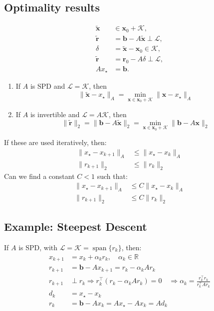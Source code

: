\subsection*{Optimality results}
\begin{align*}
    \widetilde{\mathbf{x}} &  \in  \mathbf{x}_0 + \mathcal{K},                  \\
    \widetilde{\mathbf{r}} & = \mathbf{b} - A\widetilde{\mathbf{x}} \perp \mathcal{L}, \\
    \delta        & = \widetilde{\mathbf{x}} - \mathbf{x}_0  \in  \mathcal{K},  \\
    \widetilde{\mathbf{r}} & = \mathbf{r}_0 - A\delta \perp \mathcal{L},      \\
    A x_\star     & = \mathbf{b}.
\end{align*}
\begin{enumerate}[label=(\alph*)]
    \item If $A$ is SPD and $\mathcal{L} = \mathcal{K}$, then
          \[
              \|\widetilde{\mathbf{x}} - x_\star\|_A = \min_{\mathbf{x}  \in  \mathbf{x}_0 + \mathcal{K}} \|\mathbf{x} - x_\star\|_A
          \]
    \item If $A$ is invertible and $\mathcal{L} = A\mathcal{K}$, then
          \[
              \|\widetilde{\mathbf{r}}\|_2 = \|\mathbf{b} - A\widetilde{\mathbf{x}}\|_2  = \min_{\mathbf{x}  \in  \mathbf{x}_0 + \mathcal{K}} \|\mathbf{b} - A \mathbf{x}\|_2
          \]
\end{enumerate}
If these are used iteratively, then:
\begin{align*}
    \|x_\star - x_{k+1}\|_A & \leq \|x_\star - x_k\|_A \\
    \|r_{k+1}\|_2           & \leq \|r_k\|_2
\end{align*}
Can we find a constant $C < 1$ such that:
\begin{align*}
    \|x_\star - x_{k+1}\|_A & \leq C \|x_\star - x_k\|_A \\
    \|r_{k+1}\|_2           & \leq C \|r_k\|_2
\end{align*}

\subsection*{Example: Steepest Descent}
If $A$ is SPD, with $\mathcal{L} = \mathcal{K} = \operatorname{span}\{r_k\}$, then:
\begin{align*}
    x_{k+1} & = x_k + \alpha_k r_k, \quad \alpha_k  \in  \mathbb{R}          \\
    r_{k+1} & = \mathbf{b} - A x_{k+1} = r_k - \alpha_k A r_k                       \\
    r_{k+1} & \perp r_k \Rightarrow r_k^{\top} (r_k - \alpha_k A r_k) = 0 \quad
    \Rightarrow \alpha_k = \frac{r_k^{\top} r_k}{r_k^{\top} A r_k}                   \\
    d_k     & = x_\star - x_k                                              \\
    r_k     & = \mathbf{b} - A x_k = A x_\star - A x_k = A d_k                      \\
\end{align*}

